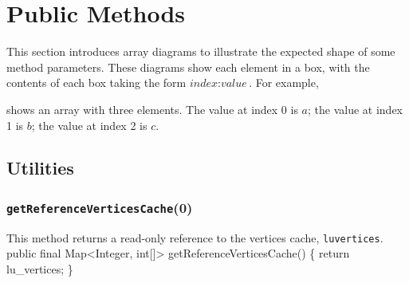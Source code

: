\documentclass{article}
\def\nwendcode{\endtrivlist \endgroup}      %
\let\nwdocspar=\par
\theoremstyle{definition}                   %
\begin{document}
\section{Public Methods}
\label{sec:public-methods}
This section introduces array diagrams to illustrate the expected shape of some
method parameters. These diagrams show each element in a box, with the contents
of each box taking the form $\textit{index}:\textit{value}$. For example,


\noindent shows an array with three elements. The value at index 0 is $a$; the
value at index 1 is $b$; the value at index 2 is $c$.

\subsection{Utilities}
\label{sec:utilities}

\subsubsection{{\tt{}\protect{}getReferenceVerticesCache}(0)}
This method returns a read-only reference to the vertices cache,
{\tt{}\protect{}lu{}vertices}.
\nwenddocs{}\endmoddef{}
public final Map<Integer, int[]> getReferenceVerticesCache() \{
  return lu_vertices;
\}
\eatline
{}\nwendcode{}\nwdocspar
\end{document}
